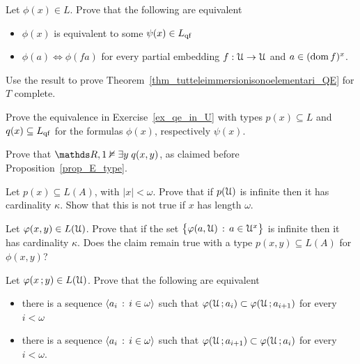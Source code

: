 \begin{exercise}\label{ex_qe_in_U}
  Let $\phi(x)\in L$. Prove that the following are equivalent
  \begin{itemize}
   \item[1.] $\phi(x)$ is equivalent to some $\psi(x)\in L_{\rm qf}$
   \item[2.] $\phi(a)\iff\phi(fa)$ for every partial embedding $f:\EuScript U\to\EuScript U$ and $a\in(\mathop{\rm dom} f)^x$.
  \end{itemize}
  Use the result to prove Theorem~\ref{thm_tutteleimmersionisonoelementari_QE} for $T$ complete.
\end{exercise}

\begin{exercise}
  Prove the equivalence in Exercise~\ref{ex_qe_in_U}  with types $p(x)\subseteq L$ and  $q(x)\subseteq L_{\rm qf}$ for the formulas $\phi(x)$, respectively $\psi(x)$.
\end{exercise}

\begin{exercise}\label{ex_E_type}
  Prove that $\RR,1\notmodels\E y\;q(x,y)$, as claimed before Proposition~\ref{prop_E_type}.
\end{exercise}

\begin{exercise}\label{cadinalitafinitasaturazione}
  Let $p(x)\subseteq L(A)$, with $|x|<\omega$. 
  Prove that if $p(\EuScript U)$ is infinite then it has cardinality $\kappa$. 
  Show that this is not true if $x$ has length $\omega$. 
\end{exercise}

\begin{exercise}\label{cadinalitafinitasaturazioneinsiemi}
  Let $\varphi(x,y)\in L(\EuScript U)$. Prove that if the set $\big\{\varphi(a,\EuScript U)\, :\, a\in\EuScript U^x\big\}$ is infinite then it has cardinality $\kappa$.
  Does the claim remain true with a type $p(x,y)\subseteq L(A)$ for $\phi(x,y)$?
\end{exercise}

\begin{exercise}\label{ex_saturazione_catene_insiemi}
  Let $\varphi(x\,;y)\in L(\EuScript U)$.
  Prove that the following are equivalent
  \begin{itemize}
  \item[1.] there is a sequence $\langle a_i\,:\,i\in\omega\rangle$ such that $\varphi(\EuScript U\,;a_i)\subset\varphi(\EuScript U\,;a_{i+1})$ for every $i<\omega$
  \item[2.] there is a sequence $\langle a_i\,:\,i\in\omega\rangle$ such that $\varphi(\EuScript U\,;a_{i+1})\subset\varphi(\EuScript U\,;a_i)$ for every $i<\omega$.
  \end{itemize}
\end{exercise}

